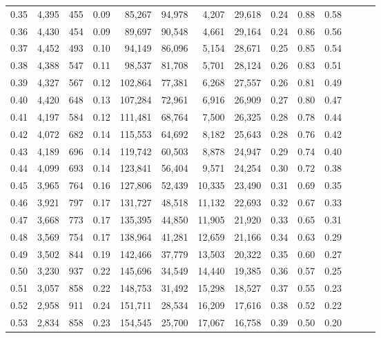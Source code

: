 \begin{tabular}{rrrrrrrrrrrrrr}
0.35 &  4,395 &  455 &  0.09 &   85,267 &   94,978 &   4,207 &  29,618 &  0.24 &  0.88 &      0.58 \\
0.36 &  4,430 &  454 &  0.09 &   89,697 &   90,548 &   4,661 &  29,164 &  0.24 &  0.86 &      0.56 \\
0.37 &  4,452 &  493 &  0.10 &   94,149 &   86,096 &   5,154 &  28,671 &  0.25 &  0.85 &      0.54 \\
0.38 &  4,388 &  547 &  0.11 &   98,537 &   81,708 &   5,701 &  28,124 &  0.26 &  0.83 &      0.51 \\
0.39 &  4,327 &  567 &  0.12 &  102,864 &   77,381 &   6,268 &  27,557 &  0.26 &  0.81 &      0.49 \\
0.40 &  4,420 &  648 &  0.13 &  107,284 &   72,961 &   6,916 &  26,909 &  0.27 &  0.80 &      0.47 \\
0.41 &  4,197 &  584 &  0.12 &  111,481 &   68,764 &   7,500 &  26,325 &  0.28 &  0.78 &      0.44 \\
0.42 &  4,072 &  682 &  0.14 &  115,553 &   64,692 &   8,182 &  25,643 &  0.28 &  0.76 &      0.42 \\
0.43 &  4,189 &  696 &  0.14 &  119,742 &   60,503 &   8,878 &  24,947 &  0.29 &  0.74 &      0.40 \\
0.44 &  4,099 &  693 &  0.14 &  123,841 &   56,404 &   9,571 &  24,254 &  0.30 &  0.72 &      0.38 \\
0.45 &  3,965 &  764 &  0.16 &  127,806 &   52,439 &  10,335 &  23,490 &  0.31 &  0.69 &      0.35 \\
0.46 &  3,921 &  797 &  0.17 &  131,727 &   48,518 &  11,132 &  22,693 &  0.32 &  0.67 &      0.33 \\
0.47 &  3,668 &  773 &  0.17 &  135,395 &   44,850 &  11,905 &  21,920 &  0.33 &  0.65 &      0.31 \\
0.48 &  3,569 &  754 &  0.17 &  138,964 &   41,281 &  12,659 &  21,166 &  0.34 &  0.63 &      0.29 \\
0.49 &  3,502 &  844 &  0.19 &  142,466 &   37,779 &  13,503 &  20,322 &  0.35 &  0.60 &      0.27 \\
0.50 &  3,230 &  937 &  0.22 &  145,696 &   34,549 &  14,440 &  19,385 &  0.36 &  0.57 &      0.25 \\
0.51 &  3,057 &  858 &  0.22 &  148,753 &   31,492 &  15,298 &  18,527 &  0.37 &  0.55 &      0.23 \\
0.52 &  2,958 &  911 &  0.24 &  151,711 &   28,534 &  16,209 &  17,616 &  0.38 &  0.52 &      0.22 \\
0.53 &  2,834 &  858 &  0.23 &  154,545 &   25,700 &  17,067 &  16,758 &  0.39 &  0.50 &      0.20 \\

\end{tabular}
